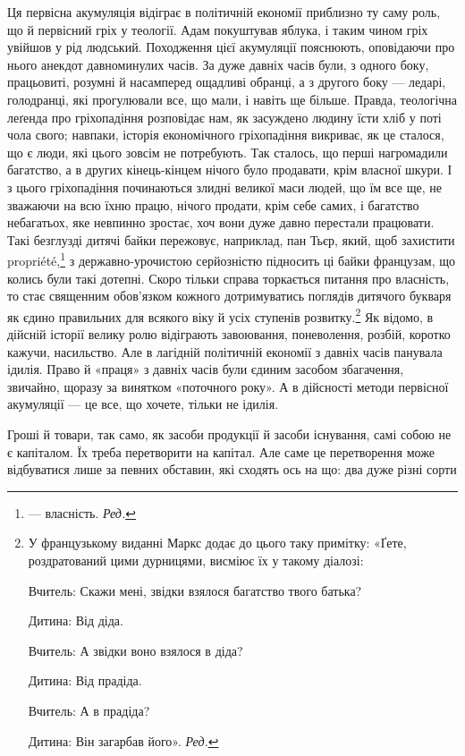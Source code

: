 Ця первісна акумуляція відіграє в політичній економії приблизно
ту саму роль, що й первісний гріх у теології. Адам покуштував
яблука, і таким чином гріх увійшов у рід людський.
Походження цієї акумуляції пояснюють, оповідаючи про нього
анекдот давноминулих часів. За дуже давніх часів були, з
одного боку, працьовиті, розумні й насамперед ощадливі обранці,
а з другого боку — ледарі, голодранці, які прогулювали все,
що мали, і навіть ще більше. Правда, теологічна леґенда про
гріхопадіння розповідає нам, як засуждено людину їсти хліб
у поті чола свого; навпаки, історія економічного гріхопадіння
викриває, як це сталося, що є люди, які цього зовсім не потребують.
Так сталось, що перші нагромадили багатство, а в
других кінець-кінцем нічого було продавати, крім власної
шкури. І з цього гріхопадіння починаються злидні великої маси
людей, що їм все ще, не зважаючи на всю їхню працю, нічого
продати, крім себе самих, і багатство небагатьох, яке невпинно
зростає, хоч вони дуже давно перестали працювати. Такі безглузді
дитячі байки пережовує, наприклад, пан Тьєр, який,
щоб захистити propriété,\footnote*{
— власність. \emph{Ред.}
} з державно-урочистою серйозністю
підносить ці байки французам, що колись були такі дотепні.
Скоро тільки справа торкається питання про власність, то стає
священним обов’язком кожного дотримуватись поглядів дитячого
букваря як єдино правильних для всякого віку й усіх ступенів
розвитку.\footnote*{
У французькому виданні Маркс додає до цього таку примітку:
«Ґете, роздратований цими дурницями, висміює їх у такому діалозі:

Вчитель: Скажи мені, звідки взялося багатство твого батька?

Дитина: Від діда.

Вчитель: А звідки воно взялося в діда?

Дитина: Від прадіда.

Вчитель: А в прадіда?

Дитина: Він загарбав його». \emph{Ред.}
} Як відомо, в дійсній історії велику ролю відіграють
завоювання, поневолення, розбій, коротко кажучи, насильство.
Але в лагідній політичній економії з давніх часів панувала
ідилія. Право й «праця» з давніх часів були єдиним засобом
збагачення, звичайно, щоразу за винятком «поточного року».
А в дійсності методи первісної акумуляції — це все, що хочете,
тільки не ідилія.

Гроші й товари, так само, як засоби продукції й засоби існування,
самі собою не є капіталом. Їх треба перетворити на капітал.
Але саме це перетворення може відбуватися лише за певних
обставин, які сходять ось на що: два дуже різні сорти
\parbreak{}

